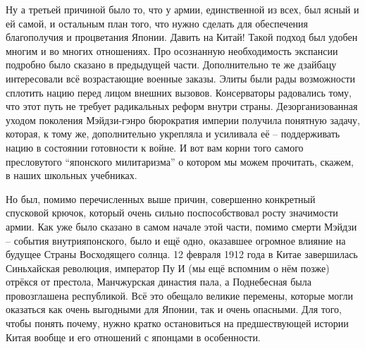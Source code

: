 Ну а третьей причиной было то, что у армии, единственной из всех, был ясный и ей самой, и остальным план того, что нужно сделать для обеспечения благополучия и процветания Японии. Давить на Китай! Такой подход был удобен многим и во многих отношениях. Про осознанную необходимость экспансии подробно было сказано в предыдущей части. Дополнительно те же дзайбацу интересовали всё возрастающие военные заказы. Элиты были рады возможности сплотить нацию перед лицом внешних вызовов. Консерваторы радовались тому, что этот путь не требует радикальных реформ внутри страны. Дезорганизованная уходом поколения Мэйдзи-гэнро бюрократия империи получила понятную задачу, которая, к тому же, дополнительно укрепляла и усиливала её – поддерживать нацию в состоянии готовности к войне. И вот вам корни того самого пресловутого “японского милитаризма” о котором мы можем прочитать, скажем, в наших школьных учебниках.

Но был, помимо перечисленных выше причин, совершенно конкретный спусковой крючок, который очень сильно поспособствовал росту значимости армии. Как уже было сказано в самом начале этой части, помимо смерти Мэйдзи – события внутрияпонского, было и ещё одно, оказавшее огромное влияние на будущее Страны Восходящего солнца. 12 февраля 1912 года в Китае завершилась Синьхайская революция, император Пу И (мы ещё вспомним о нём позже) отрёкся от престола, Манчжурская династия пала, а Поднебесная была провозглашена республикой. Всё это обещало великие перемены, которые могли оказаться как очень выгодными для Японии, так и очень опасными. Для того, чтобы понять почему, нужно кратко остановиться на предшествующей истории Китая вообще и его отношений с японцами в особенности.

